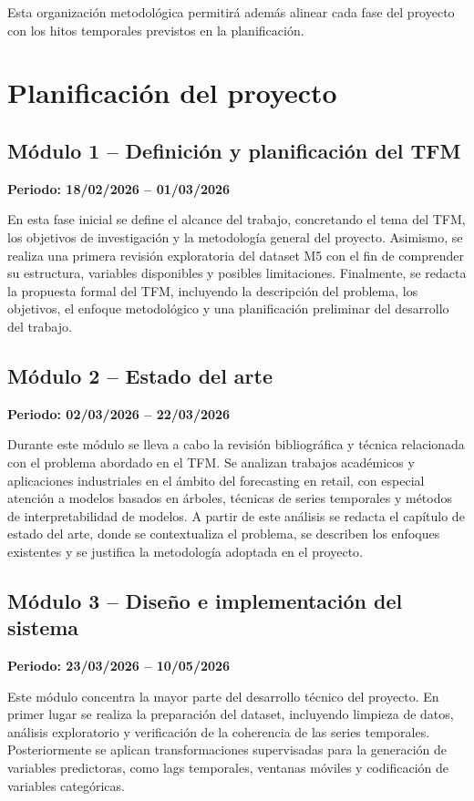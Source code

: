 \documentclass[IB,BIB]{TFUOC}%
\begin{document}
Esta organización metodológica permitirá además alinear cada fase del
proyecto con los hitos temporales previstos en la planificación.

\newpage
\section{Planificación del proyecto}

\subsection{Módulo 1 -- Definición y planificación del TFM}

\textbf{Periodo: 18/02/2026 -- 01/03/2026}

En esta fase inicial se define el alcance del trabajo, concretando el
tema del TFM, los objetivos de investigación y la metodología general
del proyecto. Asimismo, se realiza una primera revisión exploratoria del
dataset M5 con el fin de comprender su estructura, variables disponibles
y posibles limitaciones. Finalmente, se redacta la propuesta formal del
TFM, incluyendo la descripción del problema, los objetivos, el enfoque
metodológico y una planificación preliminar del desarrollo del trabajo.

\subsection{Módulo 2 -- Estado del arte}

\textbf{Periodo: 02/03/2026 -- 22/03/2026}

Durante este módulo se lleva a cabo la revisión bibliográfica y técnica
relacionada con el problema abordado en el TFM. Se analizan trabajos
académicos y aplicaciones industriales en el ámbito del forecasting en
retail, con especial atención a modelos basados en árboles, técnicas de
series temporales y métodos de interpretabilidad de modelos. A partir de
este análisis se redacta el capítulo de estado del arte, donde se
contextualiza el problema, se describen los enfoques existentes y se
justifica la metodología adoptada en el proyecto.

\subsection{Módulo 3 -- Diseño e implementación del sistema}

\textbf{Periodo: 23/03/2026 -- 10/05/2026}

Este módulo concentra la mayor parte del desarrollo técnico del
proyecto. En primer lugar se realiza la preparación del dataset,
incluyendo limpieza de datos, análisis exploratorio y verificación de la
coherencia de las series temporales. Posteriormente se aplican
transformaciones supervisadas para la generación de variables
predictoras, como lags temporales, ventanas móviles y codificación de
variables categóricas.
\end{document}
